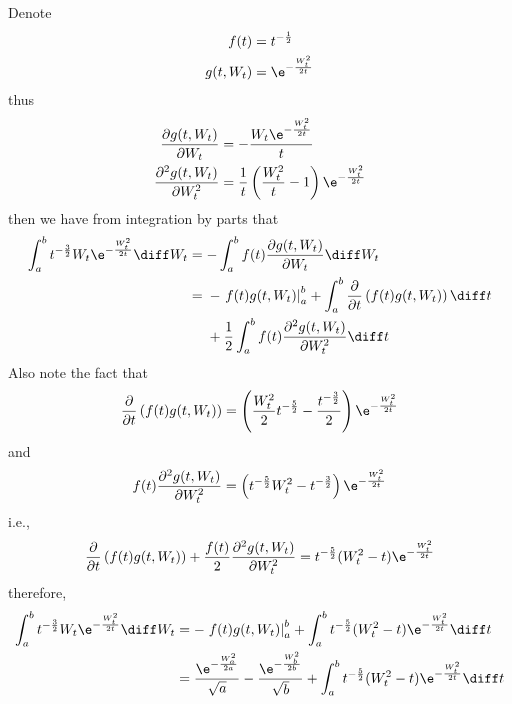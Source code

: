     \problem
    Denote
    \[\begin{aligned}
        f(t)&=t^{-\frac{1}{2}}\\
        g(t,W_t)&=\e^{-\frac{W_t^2}{2t}}
    \end{aligned}\]
    thus
    \[\begin{aligned}
        \frac{\partial g(t,W_t)}{\partial W_t}
        &=-\frac{W_t\e^{-\frac{W_t^2}{2t}}}{t}\\
        \frac{\partial^2 g(t,W_t)}{\partial W_t^2}
        &=\frac{1}{t}\left(\frac{W_t^2}{t}-1\right)\e^{-\frac{W_t^2}{2t}}
    \end{aligned}\]
    then we have from integration by parts that
    \[\begin{aligned}
        \int_a^bt^{-\frac{3}{2}}W_t\e^{-\frac{W_t^2}{2t}}\diff W_t
        &=-\int_a^bf(t)\frac{\partial g(t,W_t)}{\partial W_t}\diff W_t\\
        &=\begin{aligned}[t]
        &-\left.f(t)g(t,W_t)\right|_a^b
         +\int_a^b\frac{\partial}{\partial t}\left(f(t)g(t,W_t)\right)\diff t\\
        &+\frac{1}{2}\int_a^bf(t)\frac{\partial^2g(t,W_t)}{\partial W_t^2}\diff t
        \end{aligned}
    \end{aligned}\]
    Also note the fact that
    \[\frac{\partial}{\partial t}\left(f(t)g(t,W_t)\right)
    =\left(\frac{W_t^2}{2}t^{-\frac{5}{2}}-\frac{t^{-\frac{3}{2}}}{2}\right)
    \e^{-\frac{W_t^2}{2t}}\]
    and
    \[f(t)\frac{\partial^2g(t,W_t)}{\partial W_t^2}
    =\left(t^{-\frac{5}{2}}W_t^2-t^{-\frac{3}{2}}\right)\e^{-\frac{W_t^2}{2t}}\]
    i.e.,
    \[\frac{\partial}{\partial t}\left(f(t)g(t,W_t)\right)
    +\frac{f(t)}{2}\frac{\partial^2g(t,W_t)}{\partial W_t^2}
    =t^{-\frac{5}{2}}(W_t^2-t)\e^{-\frac{W_t^2}{2t}}\]
    therefore,
    \[\begin{aligned}
        \int_a^bt^{-\frac{3}{2}}W_t\e^{-\frac{W_t^2}{2t}}\diff W_t
        &=-\left.f(t)g(t,W_t)\right|_a^b
        +\int_a^bt^{-\frac{5}{2}}(W_t^2-t)\e^{-\frac{W_t^2}{2t}}\diff t\\
        &=\frac{\e^{-\frac{W_a^2}{2a}}}{\sqrt a}
        -\frac{\e^{-\frac{W_b^2}{2b}}}{\sqrt b}
        +\int_a^bt^{-\frac{5}{2}}(W_t^2-t)\e^{-\frac{W_t^2}{2t}}\diff t\\
    \end{aligned}\]

    \appendix
